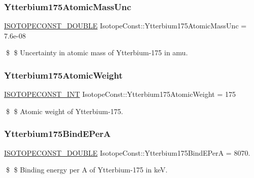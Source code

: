 \subsubsection{\texorpdfstring{Ytterbium175\+Atomic\+Mass\+Unc}{Ytterbium175AtomicMassUnc}}
{\footnotesize\ttfamily \mbox{\hyperlink{group___isotope_const-_macros_ga8f45a7272ce02c0b4c65c44636ed719a}{I\+S\+O\+T\+O\+P\+E\+C\+O\+N\+S\+T\+\_\+\+D\+O\+U\+B\+LE}} Isotope\+Const\+::\+Ytterbium175\+Atomic\+Mass\+Unc = 7.\+6e-\/08}

\$ \$ Uncertainty in atomic mass of Ytterbium-\/175 in amu. \mbox{\label{group___isotope_const-_ytterbium-_yb175_ga686878a38618e4bc89a0416bd9104eab}} 
\subsubsection{\texorpdfstring{Ytterbium175\+Atomic\+Weight}{Ytterbium175AtomicWeight}}
{\footnotesize\ttfamily \mbox{\hyperlink{group___isotope_const-_macros_ga5f18360b3e99483a35c32d789e62621c}{I\+S\+O\+T\+O\+P\+E\+C\+O\+N\+S\+T\+\_\+\+I\+NT}} Isotope\+Const\+::\+Ytterbium175\+Atomic\+Weight = 175}

\$ \$ Atomic weight of Ytterbium-\/175. \mbox{\label{group___isotope_const-_ytterbium-_yb175_ga1c5f6b13a598f09617a7cee5e9a5c4ee}} 
\subsubsection{\texorpdfstring{Ytterbium175\+Bind\+E\+PerA}{Ytterbium175BindEPerA}}
{\footnotesize\ttfamily \mbox{\hyperlink{group___isotope_const-_macros_ga8f45a7272ce02c0b4c65c44636ed719a}{I\+S\+O\+T\+O\+P\+E\+C\+O\+N\+S\+T\+\_\+\+D\+O\+U\+B\+LE}} Isotope\+Const\+::\+Ytterbium175\+Bind\+E\+PerA = 8070.}

\$ \$ Binding energy per A of Ytterbium-\/175 in keV. \mbox{\label{group___isotope_const-_ytterbium-_yb175_gae2fe3b941fc7868ab5ef3d3add4f749a}} 
